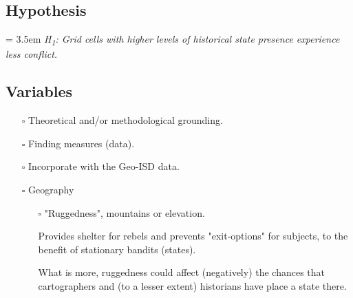 \documentclass[12pt]{article}
\begin{document}
\subsection{Hypothesis}
	\bigskip
	\hangindent = 3.5em
	\textit{H\textsubscript{1}: Grid cells with higher levels of historical
		state presence experience less conflict.
		}
	\bigskip 

\subsection{Variables}
\begin{itemize}
	\item[$\square$] Theoretical and/or methodological grounding.
	\item[$\square$] Finding measures (data).
	\item[$\square$] Incorporate with the Geo-ISD data.

	\item[$\square$] Geography
	\begin{itemize}
		\item[$\square$] "Ruggedness", mountains or elevation.

			Provides shelter for rebels and prevents "exit-options"
			for subjects, to the benefit of stationary bandits
			(states).

			What is more, ruggedness could affect (negatively) the
			chances that cartographers and (to a lesser extent)
			historians have place a state there.


\end{itemize}
\end{itemize}
\end{document}
